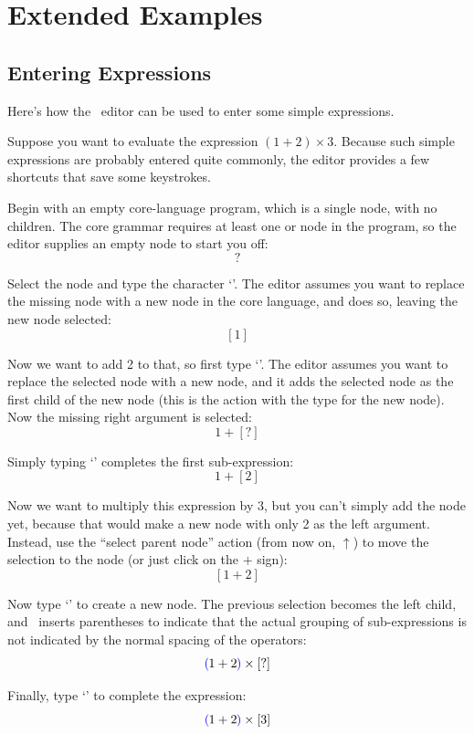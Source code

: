\chapter{Extended Examples}
\label{examples}

\section{Entering Expressions}
Here's how the \Meta\ editor can be used to enter some simple expressions.

Suppose you want to evaluate the expression $(1+2) \times 3$. Because such simple expressions are probably entered quite commonly, the editor provides a few shortcuts that save some keystrokes.

Begin with an empty core-language program, which is a single  node, with no children. The core grammar requires at least one  or  node in the program, so the editor supplies an empty node to start you off:
$$?$$

Select the node and type the character `'. The editor assumes you want to replace the missing node with a new  node in the core language, and does so, leaving the new node selected:
$$[1]$$

Now we want to add 2 to that, so first type `\clojure{+}'. The editor assumes you want to replace the selected node with a new  node, and it adds the selected node as the first child of the new node (this is the  action with the type  for the new node). Now the missing right argument is selected:
$$1+[?]$$

Simply typing `' completes the first sub-expression:
$$1+[2]$$

Now we want to multiply this expression by 3, but you can't simply add the  node yet, because that would make a new node with only 2 as the left argument. Instead, use the ``select parent node'' action (from now on, $\uparrow$) to move the selection to the  node (or just click on the $+$ sign):
$$[1+2]$$

Now type `\clojure{*}' to create a new node. The previous selection becomes the left child, and \Meta\ inserts parentheses to indicate that the actual grouping of sub-expressions is not indicated by the normal spacing of the operators:
$${\color{blue}\left(\!\right.} 1+2 {\color{blue}\left.\!\right)} \times [?]$$

Finally, type `' to complete the expression:
$${\color{blue}\left(\!\right.} 1+2 {\color{blue}\left.\!\right)} \times [3]$$

